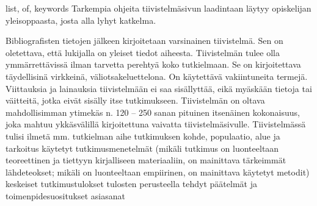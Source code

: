 \begin{itabstract}{list, of, keywords}
	Tarkempia ohjeita tiivistelmäsivun laadintaan läytyy opiskelijan
	yleisoppaasta, josta alla lyhyt katkelma.
	
	Bibliografisten tietojen jälkeen kirjoitetaan varsinainen tiivistelmä.
	Sen on oletettava, että lukijalla on yleiset tiedot aiheesta.
	Tiivistelmän tulee olla ymmärrettävissä ilman tarvetta perehtyä koko
	tutkielmaan. Se on kirjoitettava täydellisinä virkkeinä,
	väliotsakeluettelona. On käytettävä vakiintuneita termejä. Viittauksia
	ja lainauksia tiivistelmään ei saa sisällyttää, eikä myäskään tietoja
	tai väitteitä, jotka eivät sisälly itse tutkimukseen. Tiivistelmän on
	oltava mahdollisimman ytimekäs n. 120 -- 250 sanan pituinen itsenäinen
	kokonaisuus, joka mahtuu ykkäsvälillä kirjoitettuna vaivatta
	tiivistelmäsivulle. Tiivistelmässä tulisi ilmetä mm.  tutkielman aihe
	tutkimuksen kohde, populaatio, alue ja tarkoitus käytetyt
	tutkimusmenetelmät (mikäli tutkimus on luonteeltaan teoreettinen ja
	tiettyyn kirjalliseen materiaaliin, on mainittava tärkeimmät
	lähdeteokset; mikäli on luonteeltaan empiirinen, on mainittava käytetyt
	metodit) keskeiset tutkimustulokset tulosten perusteella tehdyt
	päätelmät ja toimenpidesuositukset asiasanat
\end{itabstract}
